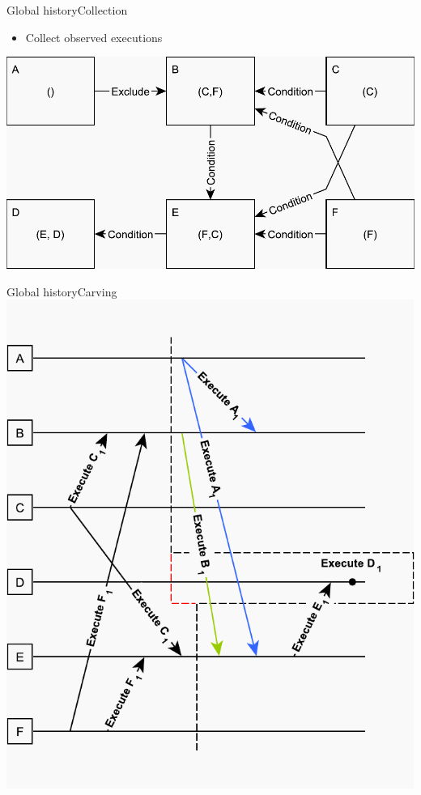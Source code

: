 \documentclass{beamer}
\begin{document}
\begin{frame}{Global history}{Collection}%
    \begin{itemize}
    	\item Collect observed executions
    \end{itemize}
    \vspace{\fill}
    \centering
    \includegraphics[scale=0.5]{figures/inconsistent-cut.pdf}
\end{frame}

\begin{frame}{Global history}{Carving}    
	\centering
    \includegraphics[scale=0.6]{figures/consistent-cut.pdf}
\end{frame}
\end{document}
